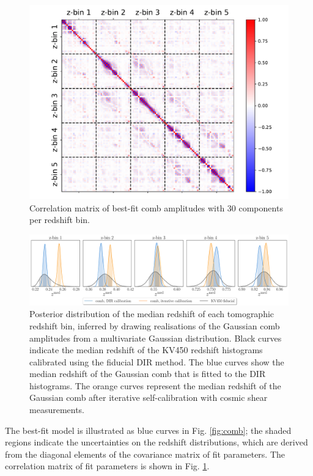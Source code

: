 \documentclass{aa}
\begin{document}
\begin{figure}
\centering
\includegraphics[width=\linewidth]{correlation_matrix.pdf}
\caption{Correlation matrix of best-fit comb amplitudes with 30 components per redshift bin.}
\label{fig:correlation_matrix}
\end{figure}
\begin{figure}
\centering
\includegraphics[width=\linewidth]{posteriors_zbins.pdf}
\caption{Posterior distribution of the median redshift of each tomographic redshift bin, inferred by drawing realisations of the Gaussian comb amplitudes from a multivariate Gaussian distribution. Black curves indicate the median redshift of the KV450 redshift histograms calibrated using the fiducial DIR method. The blue curves show the median redshift of the Gaussian comb that is fitted to the DIR histograms. The orange curves represent the median redshift of the Gaussian comb after iterative self-calibration with cosmic shear measurements.}
\label{fig:medians_posterior}
\end{figure}
The best-fit model is illustrated as blue curves in Fig. \ref{fig:comb}; the shaded regions indicate the uncertainties on the redshift distributions, which are derived from the diagonal elements of the covariance matrix of fit parameters. The correlation matrix of fit parameters is shown in Fig. \ref{fig:correlation_matrix}.  
\end{document}

